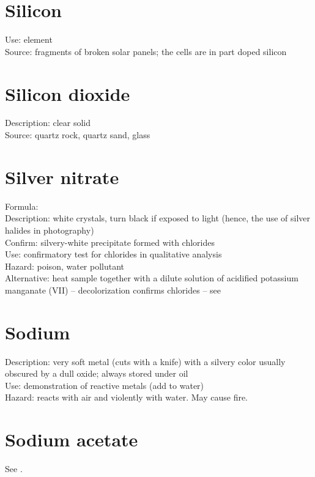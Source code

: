 \section{Silicon}
Use: element\\
Source: fragments of broken solar panels; 
the cells are in part doped silicon

\section{Silicon dioxide}
Description: clear solid\\
Source: quartz rock, 
quartz sand, 
glass

\section{Silver nitrate}
Formula: \\
Description: white crystals, 
turn black if exposed to light (hence, 
the use of silver halides in photography)\\
Confirm: silvery-white precipitate formed with chlorides\\
Use: confirmatory test for chlorides in qualitative analysis\\
Hazard: poison, 
water pollutant\\
Alternative: heat sample together 
with a dilute solution of acidified potassium manganate (VII) -- 
decolorization confirms chlorides -- see 

\section{Sodium}
Description: very soft metal (cuts with a knife) 
with a silvery color usually obscured by a dull oxide; 
always stored under oil\\
Use: demonstration of reactive metals (add to water)\\
Hazard: reacts with air and violently with water. 
May cause fire.

\section{Sodium acetate}
See .

